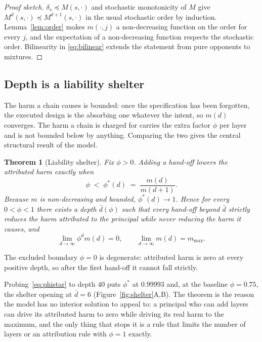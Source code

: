 \documentclass[11pt,a4paper]{article}
\newtheorem{theorem}{Theorem}
\theoremstyle{definition}
\begin{document}
\begin{proof}[Proof sketch]
$\delta_{s}\preceq M(s,\cdot)$ and stochastic monotonicity of $M$ give
$M^{d}(s,\cdot)\preceq M^{d+1}(s,\cdot)$ in the usual stochastic order by
induction. Lemma~\ref{lem:order} makes $m(\cdot,j)$ a non-decreasing function
on the order for every $j$, and the expectation of a non-decreasing function
respects the stochastic order. Bilinearity in \eqref{eq:bilinear} extends the
statement from pure opponents to mixtures.
\end{proof}

\subsection{Depth is a liability shelter}
\label{sec:shelter}

The harm a chain causes is bounded: once the specification has been forgotten,
the executed design is the absorbing one whatever the intent, so $m(d)$
converges. The harm a chain is charged for carries the extra factor $\phi$ per
layer and is not bounded below by anything. Comparing the two gives the central
structural result of the model.

\begin{theorem}[Liability shelter]
\label{thm:shelter}
Fix $\phi>0$. Adding a hand-off lowers the attributed harm exactly when
\begin{equation}
  \phi \;<\; \phi^{*}(d) \;=\; \frac{m(d)}{m(d+1)} .
  \label{eq:phistar}
\end{equation}
Because $m$ is non-decreasing and bounded, $\phi^{*}(d)\to 1$. Hence for every
$0<\phi<1$ there exists a depth $\bar d(\phi)$ such that every hand-off beyond
$\bar d$ strictly reduces the harm attributed to the principal while never
reducing the harm it causes, and
\[
  \lim_{d\to\infty}\phi^{d} m(d) = 0,
  \qquad
  \lim_{d\to\infty} m(d) = m_{\max}.
\]
\end{theorem}

The excluded boundary $\phi=0$ is degenerate: attributed harm is zero at every
positive depth, so after the first hand-off it cannot fall strictly.

Probing~\eqref{eq:phistar} to depth $40$ puts $\phi^{*}$ at $0.99993$ and, at the
baseline $\phi=0.75$, the shelter opening at $\bar d = 6$
(Figure~\ref{fig:shelter}A,B). The theorem is the reason the model has no
interior solution to appeal to: a principal who can add layers can drive its
attributed harm to zero while driving its real harm to the maximum, and the
only thing that stops it is a rule that limits the number of layers or an
attribution rule with $\phi=1$ exactly.
\end{document}
